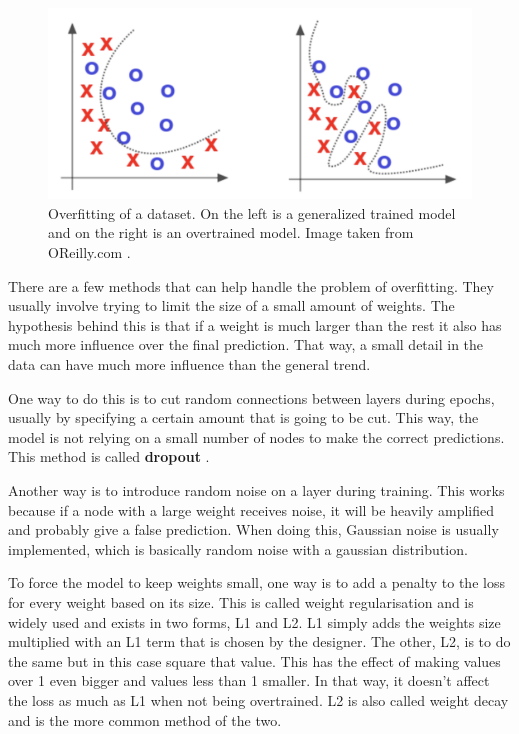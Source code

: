 \begin{figure}[hbtp]
\begin{center}
\includegraphics[width = 1.0\textwidth]{./Images/overfitting.jpg} 
\caption{Overfitting of a dataset. On the left is a generalized trained model and on the right is an overtrained model. Image taken from OReilly.com \cite{overfitting}.}
\label{fig:overfitting}
\end{center}
\end{figure}

There are a few methods that can help handle the problem of overfitting. They usually involve trying to limit the size of a small amount of weights.
The hypothesis behind this is that if a weight is much larger than the rest it also has much more influence over the final prediction. That way, a small detail in the data can have much more influence than the general trend.

One way to do this is to cut random connections between layers during epochs, usually by specifying a certain amount that is going to be cut.
This way, the model is not relying on a small number of nodes to make the correct predictions. This method is called \textbf{dropout} \cite{dropout}.

Another way is to introduce random noise on a layer during training. This works because if a node with a large weight receives noise, it will be heavily amplified and probably give a false prediction.
When doing this, Gaussian noise is usually implemented, which is basically random noise with a gaussian distribution.

To force the model to keep weights small, one way is to add a penalty to the loss for every weight based on its size. 
This is called weight regularisation and is widely used and exists in two forms, L1 and L2.
L1 simply adds the weights size multiplied with an L1 term that is chosen by the designer.
The other, L2, is to do the same but in this case square that value. This has the effect of making values over 1 even bigger and values less than 1 smaller.
In that way, it doesn't affect the loss as much as L1 when not being overtrained. L2 is also called weight decay and is the more common method of the two.

